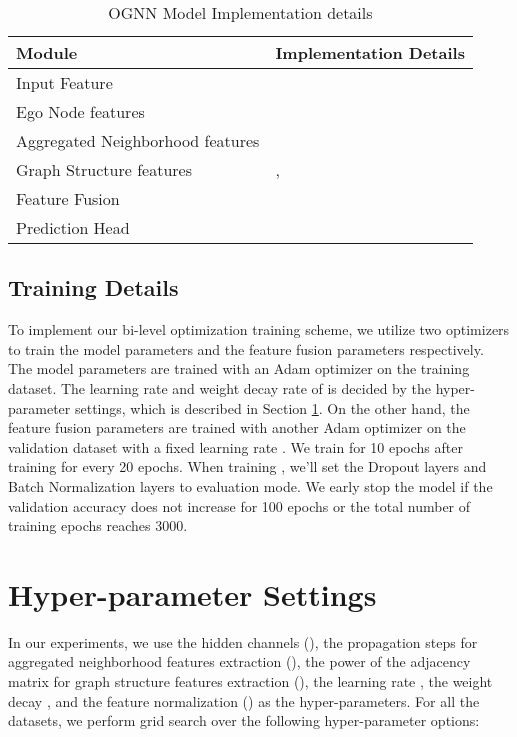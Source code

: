 \documentclass{article}
\theoremstyle{plain}
\begin{document}
\begin{table}[htb]
\centering
\caption{OGNN Model Implementation details}
\label{tab:impl}
\vskip 0.1in
\small
\tabcolsep=0.08cm
\begin{tabular}{l|l}
\toprule
Module & Implementation Details \\
\midrule
\midrule

Input Feature & \\
\midrule
Ego Node features & \\
Aggregated Neighborhood features & \\
Graph Structure features  &,  \\
\midrule
Feature Fusion & \\
\midrule
Prediction Head &\\
\bottomrule
\end{tabular}
\end{table}



\subsection{Training Details}
To implement our bi-level optimization training scheme, we utilize two optimizers to train the model parameters  and the feature fusion parameters  respectively. The model parameters  are trained with an Adam optimizer \cite{kingma2014adam}  on the training dataset. The learning rate and weight decay rate of  is decided by the hyper-parameter settings, which is described in Section \ref{sec:hps}. On the other hand, the feature fusion parameters  are trained with another Adam optimizer  on the validation dataset with a fixed learning rate . We train  for 10 epochs after training  for every 20 epochs. When training , we'll set the Dropout layers and Batch Normalization layers to evaluation mode.
We early stop the model if the validation accuracy does not increase for 100 epochs or the total number of training epochs reaches 3000.

\section{Hyper-parameter Settings} \label{sec:hps}
\label{app:hyperparameter}
In our experiments, we use the hidden channels (), the propagation steps for aggregated neighborhood features extraction (), the power of the adjacency matrix for graph structure features extraction (), the learning rate , the weight decay , and the feature normalization () as the hyper-parameters. For all the datasets, we perform grid search over the following hyper-parameter options:
\end{document}

